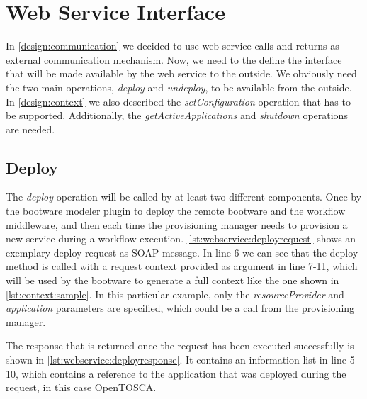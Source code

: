 \section{Web Service Interface}
\label{implementation:webservice}

In \autoref{design:communication} we decided to use web service calls and returns as external communication mechanism.
Now, we need to the define the interface that will be made available by the web service to the outside.
We obviously need the two main operations, \textit{deploy} and \textit{undeploy}, to be available from the outside.
In \autoref{design:context} we also described the \textit{setConfiguration} operation that has to be supported.
Additionally, the \textit{getActiveApplications} and \textit{shutdown} operations are needed.

\subsection{Deploy}

The \textit{deploy} operation will be called by at least two different components.
Once by the bootware modeler plugin to deploy the remote bootware and the workflow middleware, and then each time the provisioning manager needs to provision a new service during a workflow execution.
\autoref{lst:webservice:deployrequest} shows an exemplary deploy request as SOAP message.
In line 6 we can see that the deploy method is called with a request context provided as argument in line 7-11, which will be used by the bootware to generate a full context like the one shown in \autoref{lst:context:sample}.
In this particular example, only the \textit{resourceProvider} and \textit{application} parameters are specified, which could be a call from the provisioning manager.

\vspace*{\baselineskip}

The response that is returned once the request has been executed successfully is shown in \autoref{lst:webservice:deployresponse}.
It contains an information list in line 5-10, which contains a reference to the application that was deployed during the request, in this case OpenTOSCA.

